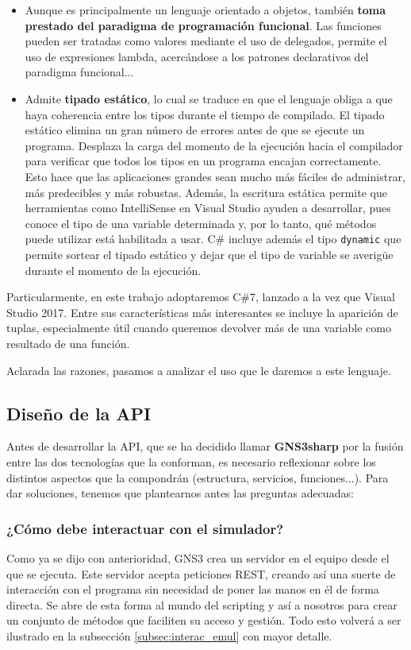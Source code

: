 \begin{itemize}
\begin{itemize}
\item Aunque es principalmente un lenguaje orientado a objetos, también \textbf{toma prestado del paradigma de programación funcional}. Las funciones pueden ser tratadas como valores mediante el uso de delegados, permite el uso de expresiones lambda, acercándose a los patrones declarativos del paradigma funcional...
\item Admite \textbf{tipado estático}, lo cual se traduce en que el lenguaje obliga a que haya coherencia entre los tipos durante el tiempo de compilado. El tipado estático elimina un gran número de errores antes de que se ejecute un programa. Desplaza la carga del momento de la ejecución hacia el compilador para verificar que todos los tipos en un programa encajan correctamente. Esto hace que las aplicaciones grandes sean mucho más fáciles de administrar, más predecibles y más robustas. Además, la escritura estática permite que herramientas como IntelliSense en Visual Studio ayuden a desarrollar, pues conoce el tipo de una variable determinada y, por lo tanto, qué métodos puede utilizar está habilitada a usar. C\# incluye además el tipo \texttt{dynamic} que permite sortear el tipado estático y dejar que el tipo de variable se averigüe durante el momento de la ejecución\cite{csnutshell}.
\end{itemize}
Particularmente, en este trabajo adoptaremos C\#7, lanzado a la vez que Visual Studio 2017. Entre sus características más interesantes se incluye la aparición de tuplas, especialmente útil cuando queremos devolver más de una variable como resultado de una función.
\end{itemize}
Aclarada las razones, pasamos a analizar el uso que le daremos a este lenguaje.

\subsection{Diseño de la API}
Antes de desarrollar la API, que se ha decidido llamar \textbf{GNS3sharp} por la fusión entre las dos tecnologías que la conforman, es necesario reflexionar sobre los distintos aspectos que la compondrán (estructura, servicios, funciones...). Para dar soluciones, tenemos que plantearnos antes las preguntas adecuadas:
\subsubsection[Interacción con GNS3]{¿Cómo debe interactuar con el simulador?}
Como ya se dijo con anterioridad, GNS3 crea un servidor en el equipo desde el que se ejecuta. Este servidor acepta peticiones REST, creando así una suerte de interacción con el programa sin necesidad de poner las manos en él de forma directa. Se abre de esta forma al mundo del scripting y así a nosotros para crear un conjunto de métodos que faciliten su acceso y gestión. Todo esto volverá a ser ilustrado en la subsección \ref{subsec:interac_emul} con mayor detalle.

